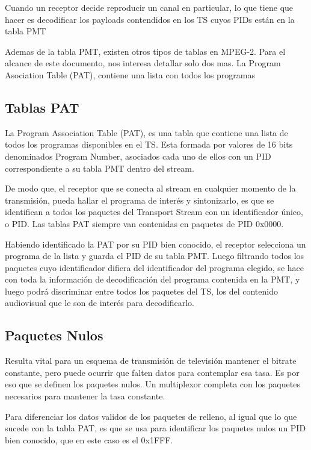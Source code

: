 	Cuando un receptor decide reproducir un canal en particular, lo que tiene que hacer es decodificar los payloads contendidos en los TS cuyos PIDs están en la tabla PMT
	
	Ademas de la tabla PMT, existen otros tipos de tablas en MPEG-2. Para el alcance de este documento, nos interesa detallar solo dos mas.
	La Program Asociation Table (PAT), contiene una lista con todos los programas 

	
	\subsection{Tablas PAT}
	La Program Association Table (PAT), es una tabla que contiene una lista de todos los programas disponibles en el TS. Esta formada por valores de 16 bits denominados Program Number, asociados cada uno de ellos con un PID correspondiente a su tabla PMT dentro del stream. 
	
	De modo que, el receptor que se conecta al stream en cualquier momento de la transmisión, pueda hallar el programa de interés y sintonizarlo, es que se identifican a todos los paquetes del Transport Stream con un identificador único, o PID. Las tablas PAT siempre van contenidas en paquetes de PID 0x0000.
	
	Habiendo identificado la PAT por su PID bien conocido, el receptor selecciona un programa de la lista y guarda el PID de su tabla PMT. Luego filtrando todos los paquetes cuyo identificador difiera del identificador del programa elegido, se hace con toda la información de decodificación del programa contenida en la PMT, y luego podrá discriminar entre todos los paquetes del TS, los del contenido audiovisual que le son de interés para decodificarlo. 
 
	
	\subsection{Paquetes Nulos}
	
	Resulta vital para un esquema de transmisión de televisión mantener el bitrate constante, pero puede ocurrir que falten datos para contemplar esa tasa. Es por eso que se definen los paquetes nulos. Un multiplexor completa con los paquetes necesarios para mantener la tasa constante.
	
	Para diferenciar los datos validos de los paquetes de relleno, al igual que lo que sucede con la tabla PAT, es que se usa para identificar los paquetes nulos un PID bien conocido, que en este caso es el 0x1FFF.

